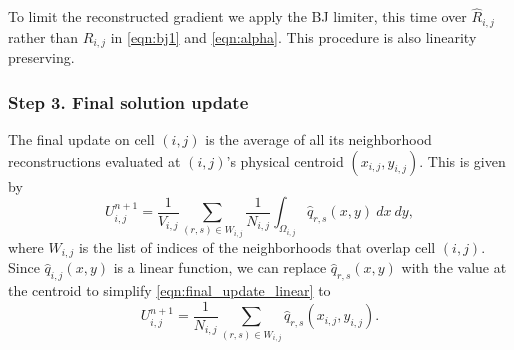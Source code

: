 
To limit the reconstructed gradient we apply the BJ limiter, this time over $\widehat{R}_{i,j}$
rather than $R_{i,j}$ in \eqref{eqn:bj1} and \eqref{eqn:alpha}.  This procedure is also 
linearity preserving. 


\subsubsection*{Step 3. Final solution update} 

The final update on cell $(i,j)$ is the average of all its neighborhood reconstructions 
evaluated at $(i,j)$'s physical centroid $(x_{i,j},y_{i,j})$. 
This is given by 
\begin{equation} \label{eqn:final_update_linear}
U^{n+1}_{i,j} =  \frac{1}{V_{i,j}}\sum_{(r,s) \in W_{i,j}}\frac{1}{N_{i,j}} \int_{\Omega_{i,j}}\widehat q_{r,s}(x,y) ~dx~dy,
\end{equation}
where $W_{i,j}$ is the list of indices of the neighborhoods that overlap cell $(i,j)$.
Since $\widehat{q}_{i,j}(x,y)$ is a linear function, 
we can replace $\widehat q_{r,s}(x,y)$ with the value at the centroid to 
simplify \eqref{eqn:final_update_linear}  to
\begin{equation} \label{eqn:final_update_linear2}
	U^{n+1}_{i,j} =   \frac{1}{N_{i,j}}\sum_{(r,s)  \in W_{i,j}}\hat{q}_{r,s}(x_{i,j},y_{i,j}).
\end{equation}

\vspace*{.5in}


